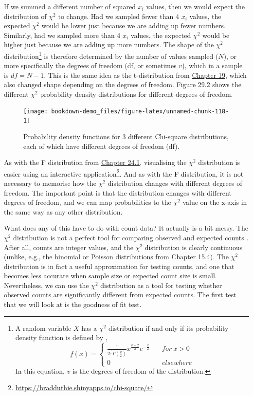 \documentclass[
  openany]{krantz}
\begin{document}
If we summed a different number of squared \(x_{i}\) values, then we would expect the distribution of \(\chi^{2}\) to change.
Had we sampled fewer than 4 \(x_{i}\) values, the expected \(\chi^{2}\) would be lower just because we are adding up fewer numbers.
Similarly, had we sampled more than 4 \(x_{i}\) values, the expected \(\chi^{2}\) would be higher just because we are adding up more numbers.
The shape of the \(\chi^{2}\) distribution\footnote{A random variable \(X\) has a \(\chi^{2}\) distribution if and only if its probability density function is defined by \citep{Miller2004}, \[f(x) = \left\{\begin{array}{ll}\frac{1}{2^{\frac{2}{v}}\Gamma\left(\frac{v}{2}\right)}x^{\frac{v-2}{2}}e^{-\frac{x}{2}} & \quad for\:x > 0 \\ 0 & \quad elsewhere \end{array}\right.\] In this equation, \(v\) is the degrees of freedom of the distribution.} is therefore determined by the number of values sampled (\(N\)), or more specifically the degrees of freedom (df, or sometimes \(v\)), which in a sample is \(df = N - 1\).
This is the same idea as the t-distribution from \protect\hyperlink{Chapter_19}{Chapter 19}, which also changed shape depending on the degrees of freedom.
Figure 29.2 shows the different \(\chi^{2}\) probability density distributions for different degrees of freedom.

\begin{figure}
\texttt{[image: bookdown-demo\_files/figure-latex/unnamed-chunk-118-1]} \caption{Probability density functions for 3 different Chi-square distributions, each of which have different degrees of freedom (df).}\label{fig:unnamed-chunk-118}
\end{figure}

As with the F distribution from \protect\hyperlink{the-f-distribution}{Chapter 24.1}, visualising the \(\chi^{2}\) distribution is easier using an interactive application\footnote{\url{https://bradduthie.shinyapps.io/chi-square/}}.
And as with the F distribution, it is not necessary to memorise how the \(\chi^{2}\) distribution changes with different degrees of freedom.
The important point is that the distribution changes with different degrees of freedom, and we can map probabilities to the \(\chi^{2}\) value on the x-axis in the same way as any other distribution.

What does any of this have to do with count data? It actually is a bit messy.
The \(\chi^{2}\) distribution is not a perfect tool for comparing observed and expected counts \citep{Sokal1995}.
After all, counts are integer values, and the \(\chi^{2}\) distribution is clearly continuous (unlike, e.g., the binomial or Poisson distributions from \protect\hyperlink{ux5cux23probability-distributions}{Chapter 15.4}).
The \(\chi^{2}\) distribution is in fact a useful approximation for testing counts, and one that becomes less accurate when sample size \citep{Slakter1968} or expected count size \citep{Tate1973} is small.
Nevertheless, we can use the \(\chi^{2}\) distribution as a tool for testing whether observed counts are significantly different from expected counts.
The first test that we will look at is the goodness of fit test.
\end{document}
